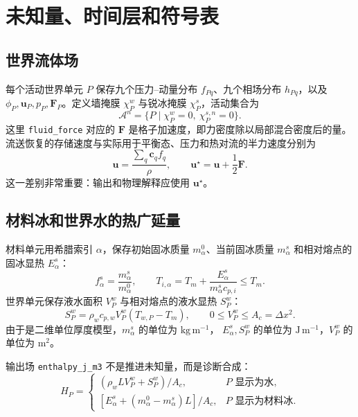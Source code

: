 \documentclass[UTF8,zihao=-4]{ctexart}
\newcommand{\vect}[1]{\boldsymbol{#1}}
\newcommand{\code}[1]{\texttt{#1}}
\newcommand{\cellarea}{A_c}
\numberwithin{equation}{section}
\begin{document}
\section{未知量、时间层和符号表}

\subsection{世界流体场}

每个活动世界单元 $P$ 保存九个压力--动量分布 $f_{Pq}$、九个相场分布 $h_{Pq}$，以及
$\phi_P,\vect u_P,p_P,\vect F_P$。定义墙掩膜 $\chi_P^w$ 与锐冰掩膜 $\chi_P^s$，活动集合为
\begin{equation}
  \mathcal A^n=\{P\mid \chi_P^w=0,\ \chi_P^{s,n}=0\}.
  \label{eq:active-set}
\end{equation}
这里 \code{fluid\_force} 对应的 $\vect F$ 是格子加速度，即力密度除以局部混合密度后的量。
流送恢复的存储速度与实际用于平衡态、压力和热对流的半力速度分别为
\begin{equation}
  \vect u=\frac{\sum_q\vect c_qf_q}{\rho},
  \qquad
  \vect u^\star=\vect u+\frac12\vect F.
  \label{eq:half-force-velocity}
\end{equation}
这一差别非常重要：输出和物理解释应使用 $\vect u^\star$。

\subsection{材料冰和世界水的热广延量}

材料单元用希腊索引 $\alpha$，保存初始固冰质量 $m_\alpha^0$、当前固冰质量
$m_\alpha^s$ 和相对熔点的固冰显热 $E_\alpha^s$：
\begin{equation}
  f_\alpha^s=\frac{m_\alpha^s}{m_\alpha^0},
  \qquad
  T_{i,\alpha}=T_m+\frac{E_\alpha^s}{m_\alpha^sc_{p,i}}\le T_m.
  \label{eq:body-thermal-state}
\end{equation}
世界单元保存液水面积 $V_P^w$ 与相对熔点的液水显热 $S_P^w$：
\begin{equation}
  S_P^w=\rho_wc_{p,w}V_P^w(T_{w,P}-T_m),
  \qquad 0\le V_P^w\le \cellarea=\Delta x^2.
  \label{eq:water-extensive-state}
\end{equation}
由于是二维单位厚度模型，$m_\alpha^s$ 的单位为 $\mathrm{kg\,m^{-1}}$，
$E_\alpha^s,S_P^w$ 的单位为 $\mathrm{J\,m^{-1}}$，$V_P^w$ 的单位为 $\mathrm m^2$。

输出场 \code{enthalpy\_j\_m3} 不是推进未知量，而是诊断合成：
\begin{equation}
  H_P=
  \begin{cases}
  (\rho_wLV_P^w+S_P^w)/\cellarea,&P\text{ 显示为水},\\
  [E_\alpha^s+(m_\alpha^0-m_\alpha^s)L]/\cellarea,&P\text{ 显示为材料冰}.
  \end{cases}
  \label{eq:diagnostic-enthalpy}
\end{equation}
\end{document}
